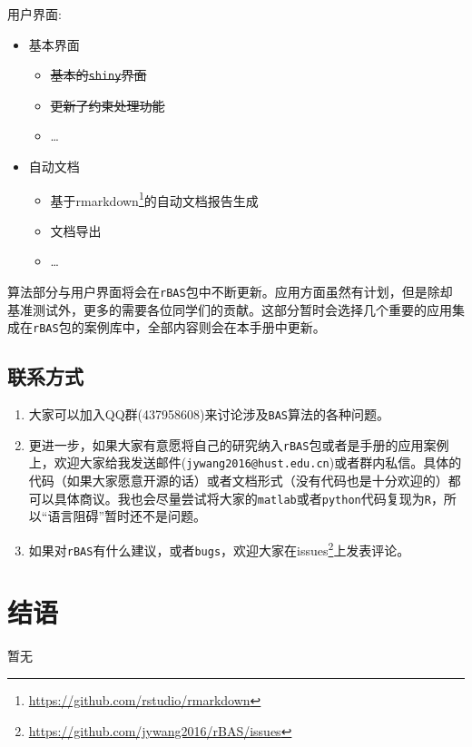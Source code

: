 \documentclass[]{ctexbook}
\providecommand{\tightlist}{%
  \setlength{\itemsep}{0pt}\setlength{\parskip}{0pt}}
\renewcommand{\href}[2]{#2\footnote{\url{#1}}}
\theoremstyle{definition}
\theoremstyle{definition}
\theoremstyle{definition}
\theoremstyle{remark}
\begin{document}
用户界面:

\begin{itemize}
\tightlist
\item
  基本界面

  \begin{itemize}
  \tightlist
  \item
    \sout{基本的\texttt{shiny}界面}
  \item
    \sout{更新了约束处理功能}
  \item
    \ldots{}
  \end{itemize}
\item
  自动文档

  \begin{itemize}
  \tightlist
  \item
    基于\href{https://github.com/rstudio/rmarkdown}{rmarkdown}的自动文档报告生成
  \item
    文档导出
  \item
    \ldots{}
  \end{itemize}
\end{itemize}

算法部分与用户界面将会在\texttt{rBAS}包中不断更新。应用方面虽然有计划，但是除却基准测试外，更多的需要各位同学们的贡献。这部分暂时会选择几个重要的应用集成在\texttt{rBAS}包的案例库中，全部内容则会在本手册中更新。

\section{联系方式}

\begin{enumerate}
\def\labelenumi{\arabic{enumi}.}
\item
  大家可以加入QQ群(437958608)来讨论涉及\texttt{BAS}算法的各种问题。
\item
  更进一步，如果大家有意愿将自己的研究纳入\texttt{rBAS}包或者是手册的应用案例上，欢迎大家给我发送邮件(\texttt{jywang2016@hust.edu.cn})或者群内私信。具体的代码（如果大家愿意开源的话）或者文档形式（没有代码也是十分欢迎的）都可以具体商议。我也会尽量尝试将大家的\texttt{matlab}或者\texttt{python}代码复现为\texttt{R}，所以``语言阻碍''暂时还不是问题。
\item
  如果对\texttt{rBAS}有什么建议，或者\texttt{bugs}，欢迎大家在\href{https://github.com/jywang2016/rBAS/issues}{issues}上发表评论。
\end{enumerate}

\cleardoublepage 

\appendix {}


\chapter*{结语}


暂无



\backmatter
\printindex
\end{document}
